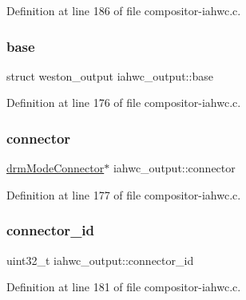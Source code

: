 Definition at line 186 of file compositor-\/iahwc.\+c.

\mbox{\label{structiahwc__output_a33611f9c8d1354ea9c4df7c6077f593e}} 
\subsubsection{\texorpdfstring{base}{base}}
{\footnotesize\ttfamily struct weston\+\_\+output iahwc\+\_\+output\+::base}



Definition at line 176 of file compositor-\/iahwc.\+c.

\mbox{\label{structiahwc__output_ab3dc520b844eed75e64c4732b8355f35}} 
\subsubsection{\texorpdfstring{connector}{connector}}
{\footnotesize\ttfamily \mbox{\hyperlink{nativedisplay_8h_a16ea3fc6b16060fd1e1257707006440e}{drm\+Mode\+Connector}}$\ast$ iahwc\+\_\+output\+::connector}



Definition at line 177 of file compositor-\/iahwc.\+c.

\mbox{\label{structiahwc__output_ae1cf365db62f007f6a3d30bd19b5b0c8}} 
\subsubsection{\texorpdfstring{connector\+\_\+id}{connector\_id}}
{\footnotesize\ttfamily uint32\+\_\+t iahwc\+\_\+output\+::connector\+\_\+id}



Definition at line 181 of file compositor-\/iahwc.\+c.

\mbox{\label{structiahwc__output_a6e3ab85b62b65859fdb94afd042bfd00}} 
